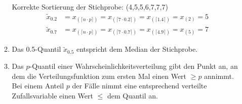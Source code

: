 \documentclass[a4paper]{scrartcl}
\def \blattnr {6}
\begin{document}
\begin{enumerate}[label=\bfseries \blattnr.\arabic*]
\begin{enumerate}
    Korrekte Sortierung der Stichprobe: (4,5,5,6,7,7,7)
    \begin{align*}
        \tilde x_{\num{0.2}}
        &= x_{(\lceil n \cdot p \rceil)}
        = x_{(\lceil 7 \cdot 0.2 \rceil)}
        = x_{(\lceil 1.4 \rceil)}
        = x_{(2)} = 5 \\
        \tilde x_{0.7}
        &= x_{(\lceil n \cdot p \rceil)}
        = x_{(\lceil 7 \cdot 0.7 \rceil)}
        = x_{(\lceil 4.9 \rceil)}
        = x_{(5)} = 7
    \end{align*}

 \item
     Das \num{0,5}-Quantil $\tilde x_{\num{0,5}}$ entspricht dem Median der Stichprobe.


    \item
        Das $p$-Quantil einer Wahrscheinlichkeitsverteilung gibt den Punkt an,
        an dem die Verteilungsfunktion zum ersten Mal einen Wert $\geq p$
        annimmt.
        Bei einem Anteil $p$ der Fälle nimmt eine entsprechend verteilte
        Zufallsvariable einen Wert $\leq$ dem Quantil an.


\end{enumerate}
\end{enumerate}
\end{document}
